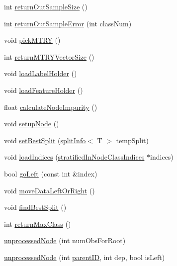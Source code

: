 \begin{DoxyCompactItemize}
\item 
int \hyperlink{classfp_1_1unprocessedNode_a0ebfd763233eeb60b9ee6a803e2dc917}{return\+Out\+Sample\+Size} ()
\item 
int \hyperlink{classfp_1_1unprocessedNode_afbeba7b37bd021e36545af60676f05d5}{return\+Out\+Sample\+Error} (int class\+Num)
\item 
void \hyperlink{classfp_1_1unprocessedNode_a5302bdd3ad2b0de3e2fcd8ed1bf58f61}{pick\+M\+T\+RY} ()
\item 
int \hyperlink{classfp_1_1unprocessedNode_a208170fb33171f64c83839abbf300705}{return\+M\+T\+R\+Y\+Vector\+Size} ()
\item 
void \hyperlink{classfp_1_1unprocessedNode_a7b286c437f8f73fb3431358c11898a82}{load\+Label\+Holder} ()
\item 
void \hyperlink{classfp_1_1unprocessedNode_a8cedeb8c4c88345ff97f9afb89b3ccd0}{load\+Feature\+Holder} ()
\item 
float \hyperlink{classfp_1_1unprocessedNode_a0278b4dd8d905d38d75ced9a95839a12}{calculate\+Node\+Impurity} ()
\item 
void \hyperlink{classfp_1_1unprocessedNode_a713ab68816b13b1a82d667ac6f1640d7}{setup\+Node} ()
\item 
void \hyperlink{classfp_1_1unprocessedNode_ae7ad0b6bf8142ea5d3d851e29b5b9aee}{set\+Best\+Split} (\hyperlink{classfp_1_1splitInfo}{split\+Info}$<$ T $>$ temp\+Split)
\item 
void \hyperlink{classfp_1_1unprocessedNode_af5580595b612e9b3f5ddc4f28c43775c}{load\+Indices} (\hyperlink{classfp_1_1stratifiedInNodeClassIndices}{stratified\+In\+Node\+Class\+Indices} $\ast$indices)
\item 
bool \hyperlink{classfp_1_1unprocessedNode_ad4ffdb4f4b91d6d21f8954f3c80a3617}{go\+Left} (const int \&index)
\item 
void \hyperlink{classfp_1_1unprocessedNode_a0236d2722cb4c32b8ff7e66fc118bed2}{move\+Data\+Left\+Or\+Right} ()
\item 
void \hyperlink{classfp_1_1unprocessedNode_a5fea1583d2250e14470d92568b57e60c}{find\+Best\+Split} ()
\item 
int \hyperlink{classfp_1_1unprocessedNode_af038553809a2e6d1cbe04adaba1c6b21}{return\+Max\+Class} ()
\item 
\hyperlink{classfp_1_1unprocessedNode_ae4835a9b488d992f299dbad40c943ae9}{unprocessed\+Node} (int num\+Obs\+For\+Root)
\item 
\hyperlink{classfp_1_1unprocessedNode_ac8c960894806adf6ca652a60f5d11e4a}{unprocessed\+Node} (int \hyperlink{classfp_1_1unprocessedNode_a74cb75f76c24622444e531a583b75c3d}{parent\+ID}, int dep, bool is\+Left)

\end{DoxyCompactItemize}
